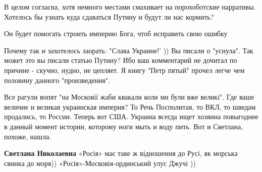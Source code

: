 \begin{itemize}

В целом согласна, хотя немного местами смахивает на порохоботские нарративы.
Хотелось бы узнать куда сдаваться Путину и будут ли нас кормить?\Laughey[1.0][white]
\begin{itemize}
Он будет помогать строить империю Бога, чтоб исправить свою ошибку
\end{itemize}
Почему так и захотелось заорать: "Слава Украине!' ))
Вы писали о "уснула". Так может это вы писали статью Путину? Ибо ваш комментарий не дочитал по причине - скучно, нудно, не цепляет. Я книгу "Петр пятый" прочел легче чем половину данного "произведения".

Все рагули вопят "на Московії жаби квакали коли ми були вже великі". Где ваше
величие и великая украинская империя? То Речь Посполитая, то ВКЛ, то шведам
продались, то России. Теперь вот США. Украина всегда ищет хозяина повыгоднее в
данный момент истории, которому ноги мыть и воду пить. Вот и Светлана, похоже,
нашла.
\begin{itemize}
\textbf{Светлана Николаевна}
«Росія» має таке ж відношення до Русі, як морська свинка до моря))
«Росія»-Московія-ординський улус Джучі ))
\end{itemize}


\end{itemize}

